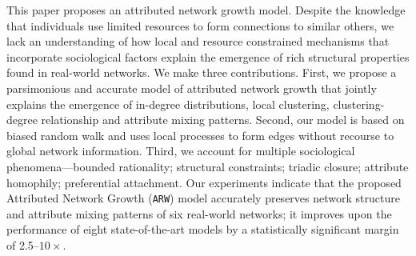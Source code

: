 
This paper proposes an attributed network growth model. Despite the knowledge
that individuals use limited resources to form connections to similar others,
we lack an understanding of how local and resource constrained mechanisms that
incorporate sociological factors explain the emergence of rich structural properties
found in real-world networks. We make three contributions. First, we propose a parsimonious
and  accurate model of attributed network growth that jointly explains the emergence
of in-degree distributions, local clustering, clustering-degree relationship and
attribute mixing patterns. Second, our model is based on biased random walk and uses
local processes to form edges without recourse to global network information.
Third, we account for multiple sociological phenomena---bounded
rationality; structural constraints; triadic closure; attribute homophily;
preferential attachment.
Our experiments indicate that the proposed Attributed Network Growth (\texttt{ARW})
model accurately preserves network structure and attribute mixing patterns of
six real-world networks; it improves upon the performance of eight state-of-the-art models by a
statistically significant margin of 2.5--$10\times$.

%
%
